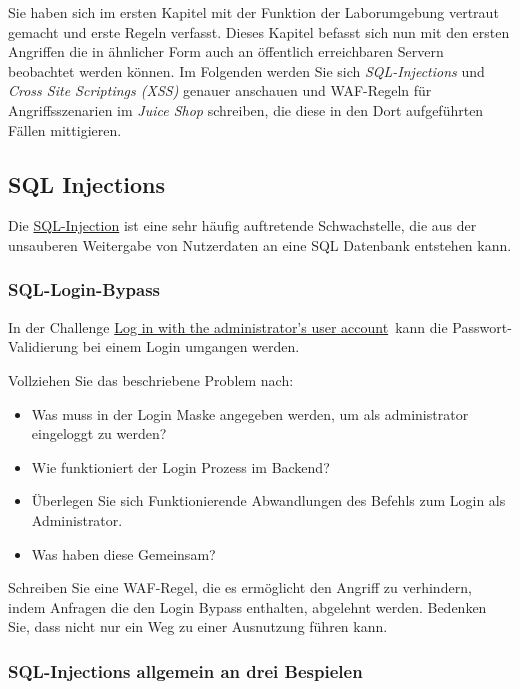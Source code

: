 Sie haben sich im ersten Kapitel mit der Funktion der Laborumgebung vertraut gemacht und erste Regeln verfasst.
Dieses Kapitel befasst sich nun mit den ersten Angriffen die in ähnlicher Form auch an öffentlich erreichbaren Servern beobachtet werden können.
Im Folgenden werden Sie sich \textit{SQL-Injections} und \textit{Cross Site Scriptings (XSS)} genauer anschauen und WAF-Regeln für Angriffsszenarien im \textit{Juice Shop} schreiben, die diese in den Dort aufgeführten Fällen mittigieren.

\subsection{SQL Injections}
Die \href{https://portswigger.net/web-security/sql-injection/cheat-sheet}{SQL-Injection} ist eine sehr häufig auftretende Schwachstelle, die aus der unsauberen Weitergabe von Nutzerdaten an eine SQL Datenbank entstehen kann.

\subsubsection{SQL-Login-Bypass}
In der Challenge \glqq\href{https://pwning.owasp-juice.shop/companion-guide/latest/part2/injection.html#_log_in_with_the_administrators_user_account}{Log in with the administrator’s user account}\grqq\ kann die Passwort-Validierung bei einem Login umgangen werden.

Vollziehen Sie das beschriebene Problem nach:
\begin{itemize}
    \item Was muss in der Login Maske angegeben werden, um als administrator eingeloggt zu werden?
    \item Wie funktioniert der Login Prozess im Backend?
    \item Überlegen Sie sich Funktionierende Abwandlungen des Befehls zum Login als Administrator.
    \item Was haben diese Gemeinsam?
\end{itemize}

Schreiben Sie eine WAF-Regel, die es ermöglicht den Angriff zu verhindern, indem Anfragen die den Login Bypass enthalten, abgelehnt werden.
Bedenken Sie, dass nicht nur ein Weg zu einer Ausnutzung führen kann.

\subsubsection{SQL-Injections allgemein an drei Bespielen}

